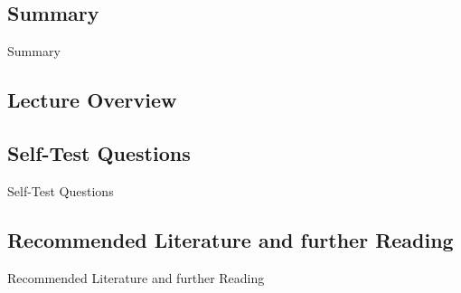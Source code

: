 \subsection{Summary}

\begin{frame}{Summary}{}

\end{frame}


\subsection{Lecture Overview}



\subsection{Self-Test Questions}

\begin{frame}{Self-Test Questions}{}

\end{frame}


\subsection{Recommended Literature and further Reading}

\begin{frame}{Recommended Literature and further Reading}{}
	\footnotesize
	\begin{thebibliography}{2}

	\end{thebibliography}
\end{frame}


\makethanks


